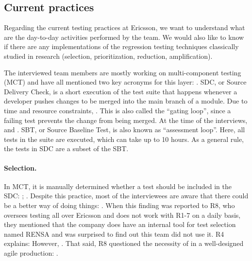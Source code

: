\subsection{Current practices}

Regarding the current testing practices at Ericsson, we want to understand what are the day-to-day activities performed by the team.
We would also like to know if there are any implementations of the regression testing techniques classically studied in research (selection, prioritization, reduction, amplification).

The interviewed team members are mostly working on multi-component testing (MCT) and have all mentioned two key acronyms for this layer: .
SDC, or Source Delivery Check, is a short execution of the test suite that happens whenever a developer pushes changes to be merged into the main branch of a module.
Due to time and resource constraints, .
This is also called the ``gating loop'', since a failing test prevents the change from being merged.
At the time of the interviews,  and .
SBT, or Source Baseline Test, is also known as ``assessment loop''.
Here, all tests in the suite are executed, which can take up to 10 hours.
As a general rule, the tests in SDC are a subset of the SBT.

\paragraph{Selection.} In MCT, it is manually determined whether a test should be included in the SDC: ; .
Despite this practice, most of the interviewees are aware that there could be a better way of doing things: .
When this finding was reported to R8, who oversees testing all over Ericsson and does not work with R1-7 on a daily basis, they mentioned that the company does have an internal tool for test selection named RENSA and was surprised to find out this team did not use it.
R4 explains:  
However, .
That said, R8 questioned the necessity of \tcs in a well-designed agile production: .

